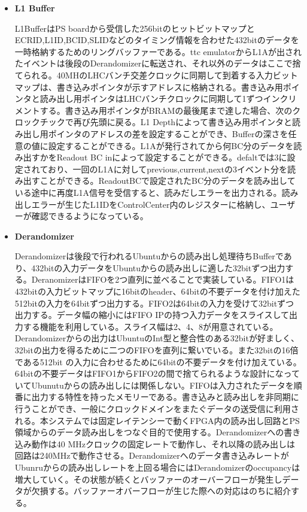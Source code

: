 \begin{itemize}
    \item \textbf{L1 Buffer} \par
    L1BufferはPS boardから受信した256bitのヒットビットマップとECRID,L1ID,BCID,SLIDなどのタイミング情報を合わせた432bitのデータを一時格納するためのリングバッファーである。ttc emulatorからL1Aが出されたイベントは後段のDerandomizerに転送され、それ以外のデータはここで捨てられる。40MHのLHCバンチ交差クロックに同期して到着する入力ビットマップは、書き込みポインタが示すアドレスに格納される。書き込み用ポインタと読み出し用ポインタはLHCバンチクロックに同期して1ずつインクリメントする。書き込み用ポインタがBRAMの最後尾まで達した場合、次のクロックチックで再び先頭に戻る。L1 Depthによって書き込み用ポインタと読み出し用ポインタのアドレスの差を設定することができ、Bufferの深さを任意の値に設定することができる。L1Aが発行されてから何BC分のデータを読み出すかをReadout BC inによって設定することができる。defaltでは3に設定されており、一回のL1Aに対してprevious,current,nextの3イベント分を読み出すことができる。ReadoutBCで設定されたBC分のデータを読み出している途中に再度L1A信号を受信すると、読みだしエラーを出力される。読み出しエラーが生じたL1IDをControlCenter内のレジスターに格納し、ユーザーが確認できるようになっている。
    \baselineskip

    \item \textbf{Derandomizer} \par
    Derandomizerは後段で行われるUbuntuからの読み出し処理待ちBufferであり、432bitの入力データをUbuntuからの読み出しに適した32bitずつ出力する。DeranomizerはFIFOを2つ直列に並べることで実装している。FIFO1は432bitの入力ビットマップに16bitのheader、64bitの不要データを付け加えた512bitの入力を64bitずつ出力する。FIFO2は64bitの入力を受けて32bitずつ出力する。データ幅の縮小にはFIFO IPの持つ入力データをスライスして出力する機能を利用している。スライス幅は2、4、8が用意されている。Derandomizerからの出力はUbuntuのInt型と整合性のある32bitが好ましく、32bitの出力を得るために二つのFIFOを直列に繋いでいる。また32bitの16倍である512bit の入力に合わせるために64bitの不要データを付け加えている。64bitの不要データはFIFO1からFIFO2の間で捨てられるような設計になっていてUbunutuからの読み出しには関係しない。FIFOは入力されたデータを順番に出力する特性を持ったメモリーである。書き込みと読み出しを非同期に行うことができ、一般にクロックドメインをまたぐデータの送受信に利用される。本システムでは固定レイテンシーで動くFPGA内の読み出し回路とPS領域からのデータ読み出しをつなぐ目的で使用する。Derandomizerへの書き込み動作は40 MHzクロックの固定レートで動作し、それ以降の読み出しは回路は240MHzで動作させる。Derandomizerへのデータ書き込みレートがUbunruからの読み出しレートを上回る場合にはDerandomizerのoccupancyは増大していく。その状態が続くとバッファーのオーバーフローが発生しデータが欠損する。バッファーオバーフローが生じた際への対応はのちに紹介する。
    \baselineskip


\end{itemize}
